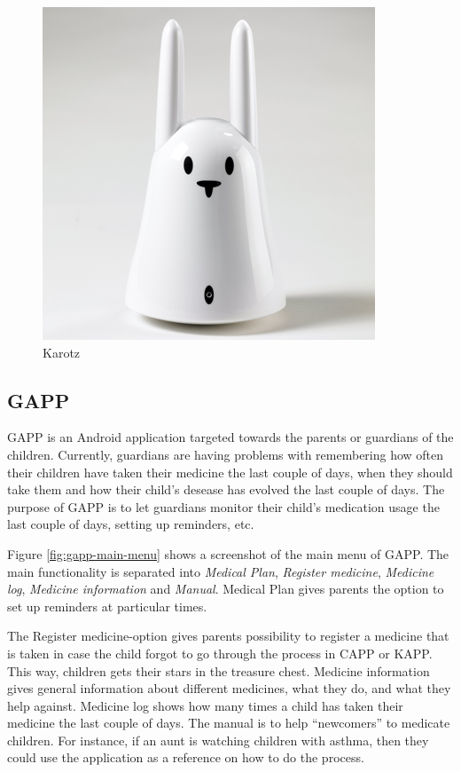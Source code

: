 

\begin{figure}
		\centering
			\includegraphics[width=0.20\paperwidth]{Pictures/karotz.jpg}
		\caption{Karotz}
		\label{fig:karotz}
\end{figure}


\subsection{GAPP}
GAPP is an Android application targeted towards the parents or guardians of the children. 
Currently, guardians are having problems with remembering how often their children have taken their medicine the last couple of days, when they should take them and how their child's desease has evolved the last couple of days. The purpose of GAPP is to let guardians monitor their child's medication usage the last couple of days, setting up reminders, etc.

Figure \ref{fig:gapp-main-menu} shows a screenshot of the main menu of GAPP. The main functionality is separated into 
\emph{Medical Plan}, \emph{Register medicine}, \emph{Medicine log}, \emph{Medicine information} and \emph{Manual}. 
Medical Plan gives parents the option to set up reminders at particular times. 

The Register medicine-option gives parents possibility to register a medicine that is taken in case the child forgot to go through the process in CAPP or KAPP. This way, children gets their stars in the treasure chest. 
Medicine information gives general information about different medicines, what they do, and what they help against.  
Medicine log shows how many times a child has taken their medicine the last couple of days.
The manual is to help ``newcomers'' to medicate children. For instance, if an aunt is watching children with asthma, then they could use the application as a reference on how to do the process. 
        
